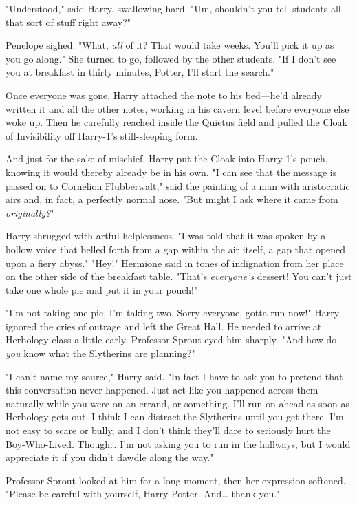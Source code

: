 "Understood," said Harry, swallowing hard. "Um, shouldn't you tell students all that sort of stuff right away?"

Penelope sighed. "What, \emph{all} of it? That would take weeks. You'll pick it up as you go along." She turned to go, followed by the other students. "If I don't see you at breakfast in thirty minutes, Potter, I'll start the search."

Once everyone was gone, Harry attached the note to his bed---he'd already written it and all the other notes, working in his cavern level before everyone else woke up. Then he carefully reached inside the Quietus field and pulled the Cloak of Invisibility off Harry-1's still-sleeping form.

And just for the sake of mischief, Harry put the Cloak into Harry-1's pouch, knowing it would thereby already be in his own.
\sbreak
"I can see that the message is passed on to Cornelion Flubberwalt," said the painting of a man with aristocratic airs and, in fact, a perfectly normal nose. "But might I ask where it came from \emph{originally?}"

Harry shrugged with artful helplessness. "I was told that it was spoken by a hollow voice that belled forth from a gap within the air itself, a gap that opened upon a fiery abyss."
\sbreak
"Hey!" Hermione said in tones of indignation from her place on the other side of the breakfast table. "That's \emph{everyone's} dessert! You can't just take one whole pie and put it in your pouch!"

"I'm not taking one pie, I'm taking two. Sorry everyone, gotta run now!" Harry ignored the cries of outrage and left the Great Hall. He needed to arrive at Herbology class a little early.
\sbreak
Professor Sprout eyed him sharply. "And how do \emph{you} know what the Slytherins are planning?"

"I can't name my source," Harry said. "In fact I have to ask you to pretend that this conversation never happened. Just act like you happened across them naturally while you were on an errand, or something. I'll run on ahead as soon as Herbology gets out. I think I can distract the Slytherins until you get there. I'm not easy to scare or bully, and I don't think they'll dare to seriously hurt the Boy-Who-Lived. Though{\ldots} I'm not asking you to run in the hallways, but I would appreciate it if you didn't dawdle along the way."

Professor Sprout looked at him for a long moment, then her expression softened. "Please be careful with yourself, Harry Potter. And{\ldots} thank you."

